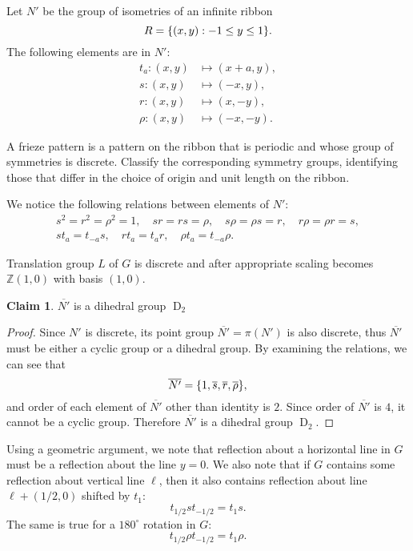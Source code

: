 \documentclass{article}
\theoremstyle{definition}
\newtheorem*{claim}{Claim}
\newcommand{\Z}{\mathbb{Z}}
\newcommand{\D}{\operatorname{D}}
\DeclarePairedDelimiter\set{\{}{\}}
\begin{document}
\begin{tcolorbox}
Let $N'$ be the group of isometries of an infinite ribbon
\[ R = \set{(x,y) : -1 \leq y \leq 1}. \]
The following elements are in $N'$:
\begin{align*}
    t_a : (x,y) & \longmapsto (x+a,y), \\
    s : (x,y) & \longmapsto (-x,y), \\
    r : (x,y) & \longmapsto (x,-y), \\
    \rho : (x,y) & \longmapsto (-x,-y).
\end{align*}

A frieze pattern is a pattern on the ribbon that is periodic and whose group of symmetries is discrete.
Classify the corresponding symmetry groups, identifying those that differ in the choice of origin and unit length on the ribbon.
\end{tcolorbox}

We notice the following relations between elements of $N'$:
\begin{gather*}
    s^2 = r^2 = \rho^2 = 1, \quad
    s r = rs = \rho, \quad
    s \rho = \rho s = r, \quad
    r \rho = \rho r = s, \\
    s t_a = t_{-a} s, \quad
    r t_a = t_a r, \quad
    \rho t_a = t_{-a} \rho.
\end{gather*}

Translation group $L$ of $G$ is discrete and after appropriate scaling becomes $\Z (1,0)$ with basis $(1,0)$.

\begin{claim}
$\overline{N'}$ is a dihedral group $\D_2$
\end{claim}

\begin{proof}
Since $N'$ is discrete, its point group $\overline{N'} = \pi (N')$ is also discrete, thus $\overline{N'}$ must be either a cyclic group or a dihedral group.
By examining the relations, we can see that
\[ \overline{N'} = \set{1, \overline{s}, \overline{r}, \overline{\rho}}, \]
and order of each element of $\overline{N'}$ other than identity is $2$.
Since order of $\overline{N'}$ is $4$, it cannot be a cyclic group.
Therefore $\overline{N'}$ is a dihedral group $\D_2$.
\end{proof}

Using a geometric argument, we note that reflection about a horizontal line in $G$ must be a reflection about the line $y=0$.
We also note that if $G$ contains some reflection about vertical line $\ell$, then it also contains reflection about line $\ell + (1/2,0)$ shifted by $t_1$:
\[ t_{1/2} s t_{-1/2} = t_1 s. \]
The same is true for a $180^\circ$ rotation in $G$:
\[ t_{1/2} \rho t_{-1/2} = t_1 \rho. \]
\end{document}
